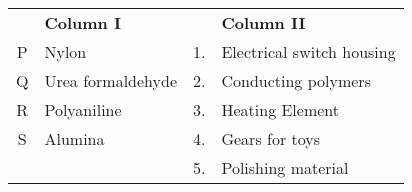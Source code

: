 \begin{tabular}{clcl}
&\textbf{Column I} & & \textbf{Column II}  \\
P & Nylon & 1. & Electrical switch housing \\
Q & Urea formaldehyde & 2. & Conducting polymers \\
R & Polyaniline & 3. & Heating Element \\
S & Alumina & 4. & Gears for toys \\
&&5.&Polishing material
\end{tabular}
